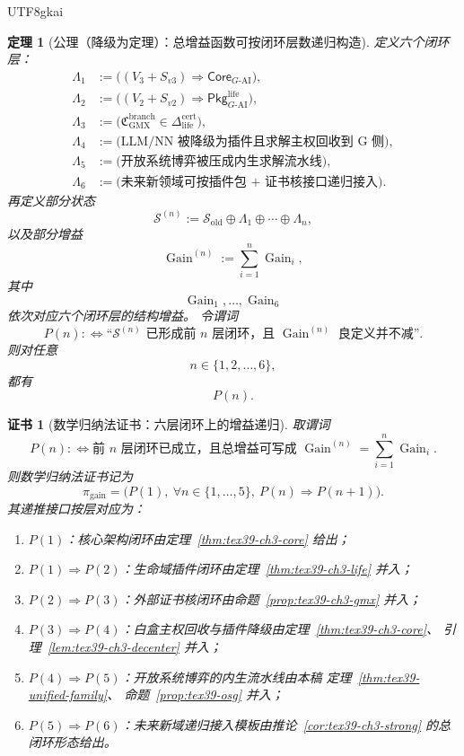 \documentclass[12pt]{article}
\newtheorem{theorem}{定理}[section]
\newtheorem{Certificate}{证书}[section]
\begin{document}
\begin{CJK*}{UTF8}{gkai}
\begin{theorem}[公理（降级为定理）：总增益函数可按闭环层数递归构造]
\label{thm:tex39-ch4-gain-recursive}
定义六个闭环层：
\[
\begin{aligned}
  \Lambda_1 &:=
  \bigl((V_3+S_{v3})\Rightarrow \mathsf{Core}_{G\text{-AI}}\bigr),\\
  \Lambda_2 &:=
  \bigl((V_2+S_{v2})\Rightarrow \mathsf{Pkg}_{G\text{-AI}}^{\mathrm{life}}\bigr),\\
  \Lambda_3 &:=
  \bigl(\mathfrak C_{\mathrm{GMX}}^{\mathrm{branch}}
  \in
  \Delta_{\mathrm{life}}^{\mathrm{cert}}\bigr),\\
  \Lambda_4 &:=
  \bigl(\text{LLM/NN 被降级为插件且求解主权回收到 G 侧}\bigr),\\
  \Lambda_5 &:=
  \bigl(\text{开放系统博弈被压成内生求解流水线}\bigr),\\
  \Lambda_6 &:=
  \bigl(\text{未来新领域可按插件包 + 证书核接口递归接入}\bigr).
\end{aligned}
\]
再定义部分状态
\[
  \mathcal S^{(n)}
  :=
  \mathcal S_{\mathrm{old}}
  \oplus
  \Lambda_1
  \oplus\cdots\oplus
  \Lambda_n,
\]
以及部分增益
\[
  \operatorname{Gain}^{(n)}
  :=
  \sum_{i=1}^{n}
  \operatorname{Gain}_i,
\]
其中
\[
  \operatorname{Gain}_1,\dots,\operatorname{Gain}_6
\]
依次对应六个闭环层的结构增益。
令谓词
\[
  P(n)
  :
  \Longleftrightarrow
  \text{“}\mathcal S^{(n)}\text{ 已形成前 }n\text{ 层闭环，且 }
  \operatorname{Gain}^{(n)}
  \text{ 良定义并不减”}.
\]
则对任意
\[
  n\in\{1,2,\dots,6\},
\]
都有
\[
  P(n).
\]
\end{theorem}

\begin{Certificate}[数学归纳法证书：六层闭环上的增益递归]
\label{cert:tex39-ch4-gain-recursive}
取谓词
\[
  P(n)
  :
  \Longleftrightarrow
  \text{前 }n\text{ 层闭环已成立，且总增益可写成 }
  \operatorname{Gain}^{(n)}
  =
  \sum_{i=1}^{n}\operatorname{Gain}_i.
\]
则数学归纳法证书记为
\[
  \pi_{\mathrm{gain}}
  =
  \bigl(
    P(1),\
    \forall n\in\{1,\dots,5\},\
    P(n)\Rightarrow P(n+1)
  \bigr).
\]
其递推接口按层对应为：
\begin{enumerate}
  \item $P(1)$：核心架构闭环由定理~\ref{thm:tex39-ch3-core} 给出；
  \item $P(1)\Rightarrow P(2)$：生命域插件闭环由定理~\ref{thm:tex39-ch3-life} 并入；
  \item $P(2)\Rightarrow P(3)$：外部证书核闭环由命题~\ref{prop:tex39-ch3-gmx} 并入；
  \item $P(3)\Rightarrow P(4)$：白盒主权回收与插件降级由定理~\ref{thm:tex39-ch3-core}、
  引理~\ref{lem:tex39-ch3-decenter} 并入；
  \item $P(4)\Rightarrow P(5)$：开放系统博弈的内生流水线由本稿
  定理~\ref{thm:tex39-unified-family}、
  命题~\ref{prop:tex39-osg}
  并入；
  \item $P(5)\Rightarrow P(6)$：未来新域递归接入模板由推论~\ref{cor:tex39-ch3-strong}
  的总闭环形态给出。
\end{enumerate}
\end{Certificate}


\end{CJK*}
\end{document}
